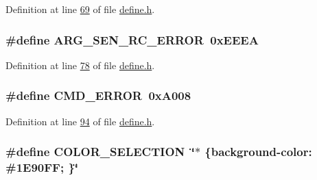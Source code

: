 Definition at line \hyperlink{a00090_source_l00069}{69} of file \hyperlink{a00090_source}{define.\+h}.

\hypertarget{a00090_a2663000c914acad476f44813681c6b5e}{
\subsubsection[{A\+R\+G\+\_\+\+S\+E\+N\+\_\+\+R\+C\+\_\+\+E\+R\+R\+O\+R}]{\setlength{\rightskip}{0pt plus 5cm}\#define A\+R\+G\+\_\+\+S\+E\+N\+\_\+\+R\+C\+\_\+\+E\+R\+R\+O\+R~0x\+E\+E\+E\+A}}\label{a00090_a2663000c914acad476f44813681c6b5e}


Definition at line \hyperlink{a00090_source_l00078}{78} of file \hyperlink{a00090_source}{define.\+h}.

\hypertarget{a00090_a1764a522e9c1a59a59be8757c69fa494}{
\subsubsection[{C\+M\+D\+\_\+\+E\+R\+R\+O\+R}]{\setlength{\rightskip}{0pt plus 5cm}\#define C\+M\+D\+\_\+\+E\+R\+R\+O\+R~0x\+A008}}\label{a00090_a1764a522e9c1a59a59be8757c69fa494}


Definition at line \hyperlink{a00090_source_l00094}{94} of file \hyperlink{a00090_source}{define.\+h}.

\hypertarget{a00090_ab32e4b2a4ecbb271c28640764ed4824c}{
\subsubsection[{C\+O\+L\+O\+R\+\_\+\+S\+E\+L\+E\+C\+T\+I\+O\+N}]{\setlength{\rightskip}{0pt plus 5cm}\#define C\+O\+L\+O\+R\+\_\+\+S\+E\+L\+E\+C\+T\+I\+O\+N~\char`\"{}$\ast$ \{background-\/color\+: \#1\+E90\+F\+F; \}\char`\"{}}}\label{a00090_ab32e4b2a4ecbb271c28640764ed4824c}


